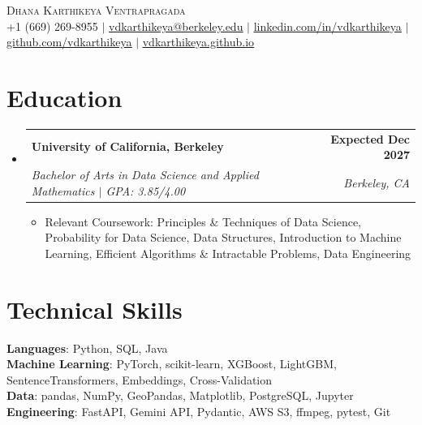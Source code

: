 \documentclass[letterpaper,11pt]{article}
\makeatletter
\newcommand{\resumeItem}[1]{%
  \item\small{{#1\vspace{-2pt}}}%
}
\newcommand{\resumeSubheading}[4]{
  \vspace{-2pt}\item
    \begin{tabular*}{1.0\textwidth}[t]{l@{\extracolsep{\fill}}r}
      \textbf{#1} & \textbf{\small #2} \\
      \textit{\small#3} & \textit{\small #4} \\
    \end{tabular*}\vspace{-7pt}
}
\newcommand{\resumeSubHeadingListStart}{\begin{itemize}[leftmargin=0.0in, label={}]}
\newcommand{\resumeSubHeadingListEnd}{\end{itemize}}
\newcommand{\resumeItemListStart}{\begin{itemize}[itemsep=2.5pt, topsep=3pt]}
\newcommand{\resumeItemListEnd}{\end{itemize}\vspace{-4pt}}
\makeatother
\begin{document}
\begin{center}
    {\Huge \scshape Dhana Karthikeya Ventrapragada} \\ \vspace{1pt}
        \footnotesize
    +1 (669) 269-8955 $|$
    \href{mailto:vdkarthikeya@berkeley.edu}{\uline{vdkarthikeya@berkeley.edu}} $|$
    \href{https://www.linkedin.com/in/vdkarthikeya/}{\uline{linkedin.com/in/vdkarthikeya}} $|$
    \href{https://github.com/vdkarthikeya}{\uline{github.com/vdkarthikeya}} $|$
    \href{https://vdkarthikeya.github.io}{\uline{vdkarthikeya.github.io}}
    \vspace{-8pt}
\end{center}

\section{Education}
\resumeSubHeadingListStart

\resumeSubheading
{University of California, Berkeley}{Expected Dec 2027}
{Bachelor of Arts in Data Science and Applied Mathematics \;$|$\; GPA: 3.85/4.00}{Berkeley, CA}

\vspace{-6pt}
\resumeItemListStart
\resumeItem{Relevant Coursework: Principles \& Techniques of Data Science, Probability for Data Science, Data Structures, Introduction to Machine Learning, Efficient Algorithms \& Intractable Problems, Data Engineering}
\resumeItemListEnd

\resumeSubHeadingListEnd
\vspace{-14pt}

\section{Technical Skills}
 \begin{itemize}[leftmargin=0.15in, label={}, itemsep=3pt]
    \small{\item{
     \textbf{Languages}{: Python, SQL, Java} \\[2pt]
     \textbf{Machine Learning}{: PyTorch, scikit-learn, XGBoost, LightGBM, SentenceTransformers, Embeddings, Cross-Validation} \\[2pt]
     \textbf{Data}{: pandas, NumPy, GeoPandas, Matplotlib, PostgreSQL, Jupyter} \\[2pt]
     \textbf{Engineering}{: FastAPI, Gemini API, Pydantic, AWS S3, ffmpeg, pytest, Git}
    }}
 \end{itemize}
 \vspace{-15pt}
\end{document}
